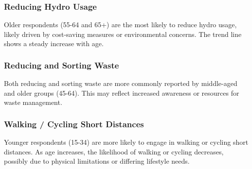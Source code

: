 \documentclass[
  letterpaper,
  DIV=11,
  numbers=noendperiod]{scrartcl}
\begin{document}
\subsubsection{Reducing Hydro Usage}\label{reducing-hydro-usage}

Older respondents (55-64 and 65+) are the most likely to reduce hydro
usage, likely driven by cost-saving measures or environmental concerns.
The trend line shows a steady increase with age.

\subsubsection{Reducing and Sorting
Waste}\label{reducing-and-sorting-waste}

Both reducing and sorting waste are more commonly reported by
middle-aged and older groups (45-64). This may reflect increased
awareness or resources for waste management.

\subsubsection{Walking / Cycling Short
Distances}\label{walking-cycling-short-distances}

Younger respondents (15-34) are more likely to engage in walking or
cycling short distances. As age increases, the likelihood of walking or
cycling decreases, possibly due to physical limitations or differing
lifestyle needs.
\end{document}
